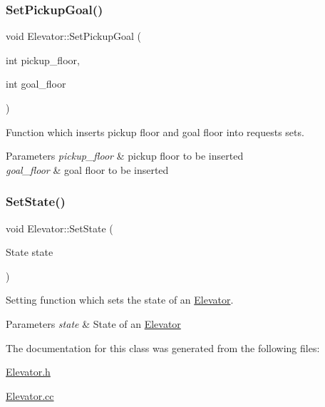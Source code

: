 \subsubsection{\texorpdfstring{Set\+Pickup\+Goal()}{SetPickupGoal()}}
{\footnotesize\ttfamily void Elevator\+::\+Set\+Pickup\+Goal (\begin{DoxyParamCaption}\item[{int}]{pickup\+\_\+floor,  }\item[{int}]{goal\+\_\+floor }\end{DoxyParamCaption})}



Function which inserts pickup floor and goal floor into requests sets. 


\begin{DoxyParams}{Parameters}
{\em pickup\+\_\+floor} & pickup floor to be inserted \\
\hline
{\em goal\+\_\+floor} & goal floor to be inserted \\
\hline
\end{DoxyParams}
\mbox{\label{class_elevator_a154bb4651ee4733f6d887d3f9cceb034}} 
\subsubsection{\texorpdfstring{Set\+State()}{SetState()}}
{\footnotesize\ttfamily void Elevator\+::\+Set\+State (\begin{DoxyParamCaption}\item[{State}]{state }\end{DoxyParamCaption})}



Setting function which sets the state of an \mbox{\hyperlink{class_elevator}{Elevator}}. 


\begin{DoxyParams}{Parameters}
{\em state} & State of an \mbox{\hyperlink{class_elevator}{Elevator}} \\
\hline
\end{DoxyParams}


The documentation for this class was generated from the following files\+:\begin{DoxyCompactItemize}
\item 
\mbox{\hyperlink{_elevator_8h}{Elevator.\+h}}\item 
\mbox{\hyperlink{_elevator_8cc}{Elevator.\+cc}}\end{DoxyCompactItemize}
